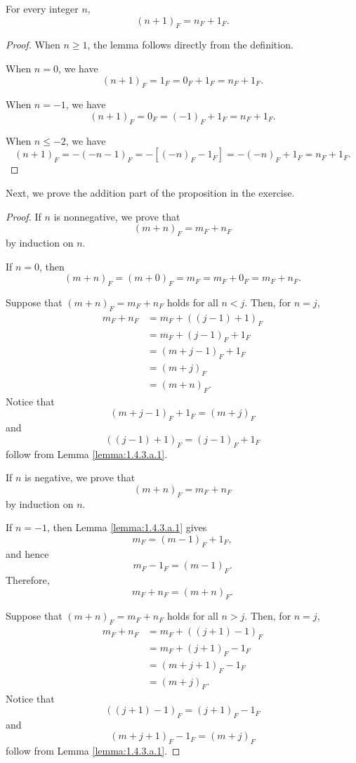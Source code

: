 \documentclass[../../../main.tex]{subfiles}
\begin{document}

\begin{lemma}
	\label{lemma:1.4.3.a.1}
	For every integer $n$,
	\[
		(n + 1)_F = n_F + 1_F.
	\]
\end{lemma}

\begin{proof}
	When $n \geq 1$, the lemma follows directly from the definition.

	When $n = 0$, we have
	\[
		(n + 1)_F = 1_F = 0_F + 1_F = n_F + 1_F.
	\]

	When $n = -1$, we have
	\[
		(n + 1)_F = 0_F = (-1)_F + 1_F = n_F + 1_F.
	\]

	When $n \leq -2$, we have
	\[
		(n + 1)_F
		= -(-n - 1)_F
		= -[(-n)_F - 1_F]
		= -(-n)_F + 1_F
		= n_F + 1_F.
	\]
\end{proof}

Next, we prove the addition part of the proposition in the exercise.

\begin{proof}
	If $n$ is nonnegative, we prove that
	\[
		(m + n)_F = m_F + n_F
	\]
	by induction on $n$.

	If $n = 0$, then
	\[
		(m + n)_F
		= (m + 0)_F
		= m_F
		= m_F + 0_F
		= m_F + n_F.
	\]

	Suppose that $(m + n)_F = m_F + n_F$ holds for all $n < j$.
	Then, for $n = j$,
	\[
		\begin{aligned}
		m_F + n_F
		&= m_F + ((j - 1) + 1)_F \\
		&= m_F + (j - 1)_F + 1_F \\
		&= (m + j - 1)_F + 1_F \\
		&= (m + j)_F \\
		&= (m + n)_F.
		\end{aligned}
	\]
	Notice that
	\[
		(m + j - 1)_F + 1_F = (m + j)_F
	\]
	and
	\[
		((j - 1) + 1)_F = (j - 1)_F + 1_F
	\]
	follow from Lemma \ref{lemma:1.4.3.a.1}.

	If $n$ is negative, we prove that
	\[
		(m + n)_F = m_F + n_F
	\]
	by induction on $n$.

	If $n = -1$, then Lemma \ref{lemma:1.4.3.a.1} gives
	\[
		m_F = (m - 1)_F + 1_F,
	\]
	and hence
	\[
		m_F - 1_F = (m - 1)_F.
	\]
	Therefore,
	\[
		m_F + n_F = (m + n)_F.
	\]

	Suppose that $(m + n)_F = m_F + n_F$ holds for all $n > j$.
	Then, for $n = j$,
	\[
		\begin{aligned}
		m_F + n_F
		&= m_F + ((j + 1) - 1)_F \\
		&= m_F + (j + 1)_F - 1_F \\
		&= (m + j + 1)_F - 1_F \\
		&= (m + j)_F.
		\end{aligned}
	\]
	Notice that
	\[
		((j + 1) - 1)_F = (j + 1)_F - 1_F
	\]
	and
	\[
		(m + j + 1)_F - 1_F = (m + j)_F
	\]
	follow from Lemma \ref{lemma:1.4.3.a.1}.
\end{proof}
\end{document}
